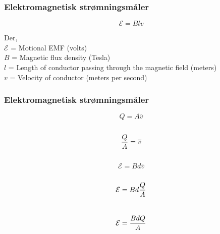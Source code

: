 \documentclass[aspectratio=169,xcolor=dvipsnames]{beamer}
\begin{document}
%
%
%
%
\begin{frame}
	\frametitle{Elektromagnetisk strømningsmåler}
$$\mathcal{E} = Blv$$

Der,
\\
$\mathcal{E}$ = Motional EMF (volts)
\\
$B$ = Magnetic flux density (Tesla)
\\
$l$ = Length of conductor passing through the magnetic field (meters)
\\
$v$ = Velocity of conductor (meters per second)
\\
\vskip 10pt

\end{frame}

%
%
%
\begin{frame}
	\frametitle{Elektromagnetisk strømningsmåler}
$$Q = A\overline{v}$$
\\
$${Q \over A} = \overline{v}$$
\\
$$\mathcal{E} = Bd\overline{v}$$
\\
$$\mathcal{E} = Bd {Q \over A}$$
\\
$$\mathcal{E} = {BdQ \over A}$$

\end{frame}
\end{document}
